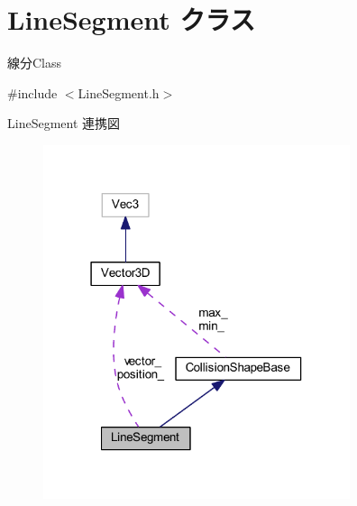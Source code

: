 \hypertarget{class_line_segment}{}\section{Line\+Segment クラス}
\label{class_line_segment}


線分\+Class  




{\ttfamily \#include $<$Line\+Segment.\+h$>$}



Line\+Segment 連携図\nopagebreak
\begin{figure}[H]
\begin{center}
\leavevmode
\includegraphics[width=255pt]{class_line_segment__coll__graph}
\end{center}
\end{figure}
